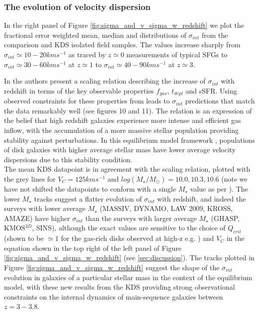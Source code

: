 \documentclass[fleqn,usenatbib]{mn2e}
\begin{document}
\subsubsection{The evolution of velocity dispersion}\label{subsubsec:sigma_evolution}

In the right panel of Figure \ref{fig:sigma_and_v_sigma_w_redshift} we plot the fractional error weighted mean, median and distributions of $\sigma_{int}$ from the comparison and KDS isolated field samples.
The values increase sharply from $\sigma_{int}\simeq10-20kms^{-1}$ as traced by $z\simeq0$ measurements of typical SFGs to $\sigma_{int}\simeq30-60kms^{-1}$ at $z\simeq1$ to $\sigma_{int}\simeq40-90kms^{-1}$ at $z\simeq3$.

In \cite{Wisnioski2015} the authors present a scaling relation describing the increase of $\sigma_{int}$ with redshift in terms of the key observable properties $f_{gas}$, $t_{depl}$ and sSFR.
Using observed constraints for these properties from \cite{Tacconi2013} leads to $\sigma_{int}$ predictions that match the data remarkably well (see \cite{Wisnioski2015} figures 10 and 11).
The relation is an expression of the belief that high redshift galaxies experience more intense and efficient gas inflow, with the accumulation of a more massive stellar population providing stability against perturbations.
In this equilibrium model framework \citep[e.g.][]{Dave2012,Lilly2013,Saintonge2013}, populations of disk galaxies with higher average stellar mass have lower average velocity dispersions due to this stability condition.  \\

The mean KDS datapoint is in agreement with the scaling relation, plotted with the grey lines for $V_{C} = 125kms^{-1}$ and $log(M_{\star}/M_{\odot})=10.0,10.3,10.6$ (note we have not shifted the datapoints to conform with a single $M_{\star}$ value as per \cite{Wisnioski2015}).
The lower $M_{\star}$ tracks suggest a flatter evolution of $\sigma_{int}$ with redshift, and indeed the surveys with lower average $M_{\star}$ (MASSIV, DYNAMO, LAW 2009, KROSS, AMAZE) have higher $\sigma_{int}$ than the surveys with larger average $M_{\star}$ (GHASP, KMOS$^{3D}$, SINS), although the exact values are sensitive to the choice of $Q_{crit}$ (shown to be $\simeq1$ for the gas-rich disks observed at high-z e.g. \citealt{ForsterSchreiber2006,Genzel2011,Newman2013}) and $V_{C}$ in the equation shown in the top right of the left panel of Figure \ref{fig:sigma_and_v_sigma_w_redshift} (see \cref{sec:discussion}).
The tracks plotted in Figure \ref{fig:sigma_and_v_sigma_w_redshift} suggest the shape of the $\sigma_{int}$ evolution in galaxies of a particular stellar mass in the context of the equilibrium model, with these new results from the KDS providing strong observational constraints on the internal dynamics of main-sequence galaxies between $z=3-3.8$.
\end{document}
